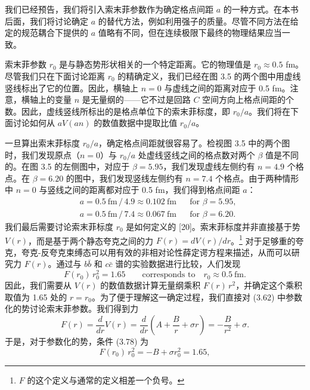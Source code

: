 我们已经预告，我们将引入索末菲参数作为确定格点间距 $a$ 的一种方式。在本书后面，我们将讨论确定 $a$ 的替代方法，例如利用强子的质量。尽管不同方法在给定的规范耦合下提供的 $a$ 值略有不同，但在连续极限下最终的物理结果应当一致。

索末菲参数 $r_0$ 是与静态势形状相关的一个特定距离。它的物理值是 $r_0 \approx 0.5$ fm。尽管我们只在下面讨论距离 $r_0$ 的精确定义，我们已经在图 3.5 的两个图中用虚线竖线标出了它的位置。因此，横轴上 $n = 0$ 与虚线之间的距离对应于 0.5 fm。注意，横轴上的变量 $n$ 是无量纲的——它不过是回路 $C$ 空间方向上格点间距的个数。因此，虚线竖线所标出的是格点单位下的索末菲标度，即 $r_0/a$。我们将在下面讨论如何从 $aV(an)$ 的数值数据中提取比值 $r_0/a$。

一旦算出索末菲标度 $r_0/a$，确定格点间距就很容易了。检视图 3.5 中的两个图时，我们发现原点（$n = 0$）与 $r_0/a$ 处虚线竖线之间的格点数对两个 $\beta$ 值是不同的。在图 3.5 的左侧图中，对应于 $\beta = 5.95$，我们发现虚线左侧约有 $n = 4.9$ 个格点。在 $\beta = 6.20$ 的图中，我们发现竖线左侧约有 $n = 7.4$ 个格点。由于两种情形中 $n = 0$ 与竖线之间的距离都对应于 0.5 fm，我们得到格点间距 $a$：
\begin{equation}
\begin{aligned}
  &a = 0.5\ \mathrm{fm}\,/\,4.9 \approx 0.102\ \mathrm{fm}
    && \text{for }\beta = 5.95 ,\\
  &a = 0.5\ \mathrm{fm}\,/\,7.4 \approx 0.067\ \mathrm{fm}
    && \text{for }\beta = 6.20 .
\end{aligned}
\end{equation}
我们最后需要讨论索末菲标度 $r_0$ 是如何定义的 [20]。索末菲标度并非直接基于势 $V(r)$，而是基于两个静态夸克之间的力 $F(r) = dV(r)/dr$。\footnote{$F$ 的这个定义与通常的定义相差一个负号。} 对于足够重的夸克，夸克-反夸克束缚态可以用有效的非相对论性薛定谔方程来描述，从而可以研究力 $F(r)$。通过与 $b\bar b$ 和 $c\bar c$ 谱的实验数据进行比较，人们发现
\begin{equation}
  F(r_0)\,r_0^2 = 1.65 \qquad \text{corresponds to} \quad r_0 \approx 0.5\ \mathrm{fm} .
\end{equation}
因此，我们需要从 $V(r)$ 的数值数据计算无量纲乘积 $F(r)\,r^2$，并确定这个乘积取值为 1.65 处的 $r = r_0$。为了便于理解这一确定过程，我们直接对 (3.62) 中参数化的势讨论索末菲参数。我们得到力
\begin{equation}
  F(r) = \frac{d}{dr}V(r)
  = \frac{d}{dr}\left(A + \frac{B}{r} + \sigma r\right)
  = -\frac{B}{r^2} + \sigma .
\end{equation}
于是，对于参数化的势，条件 (3.78) 为
\begin{equation}
  F(r_0)\,r_0^2 = -B + \sigma r_0^2 = 1.65 ,
\end{equation}
